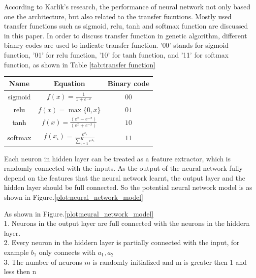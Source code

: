 \documentclass[smallextended]{svjour3}       %
\begin{document}
\begin{multicols}{2}
According to Karlik's\cite{karlik2011performance} research, the performance of
neural network not only based one the architecture, but also related to the
transfer fucntions. Mostly used transfer functions such as  sigmoid, relu, tanh and
softmax function are discussed in this paper. In order to discuss transfer
function in genetic algorithm,  different bianry codes are used to indicate
transfer function.  '00' stands for sigmoid function, '01' for relu function,
'10' for tanh function, and '11' for softmax function, as shown in Table
\ref{tab:transfer function}


\begin{center}
\begin{tabular}{ccc}
	\toprule
	Name 				 & Equation                                   & Binary
	code\\
	\midrule
	sigmoid              & $ f(x)=\frac{1}{1+e^{-x}} $  & $00$ \\
	relu                 & $ f(x)=\max \{0, x\} $       & $01$ \\
	tanh                 & $
	f(x)=\frac{\left(e^{x}-e^{-x}\right)}{\left(e^{x}+e^{-x}\right)} $&
	$10$ \\
	softmax                 & $
	f(x_i)=\frac{e^{x_i}}{\sum_{i=1}^{K} e^{x_i}}
							$ & $11$ \\
	\bottomrule
\end{tabular}
\label{tab:transfer function}
\end{center}



Each neuron in hidden layer can be treated as a feature extractor, which is
randomly connected with the inputs.  As the output of the neural network fully 
depend on the features that the neural network learnt, the output layer and
the hidden layer should be full connected.  So the potential neural network
model is as shown in Figure.\ref{plot:neural_network_model} 





As shown in Figure.\ref{plot:neural_network_model} \\
1. Neurons in the output layer are full connected with the neurons in the
hiddern layer. \\
2. Every neuron in the hiddern layer is partially connected with the input, for
example $b_1$ only connects with $a_1, a_2$\\ 
3. The number of neurons $m$ is randomly initialized and m is greater then 1 and
less then n \\

\end{multicols}
\end{document}
